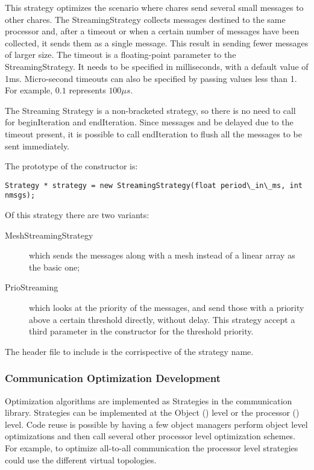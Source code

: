 {This strategy optimizes the scenario where chares send several small messages to
other chares. The StreamingStrategy collects messages destined to the same
processor and, after a timeout or when a certain number of messages have been
collected, it sends them as a single message. This result in sending fewer
messages of larger size. The timeout is a floating-point parameter to the
StreamingStrategy. It needs to be specified in milliseconds, with a default
value of 1ms. Micro-second timeouts can also be specified by passing values less
than 1. For example, $0.1$ represents $100\mu s$.

The Streaming Strategy is a non-bracketed strategy, so there is no need to call
for {\textrm{beginIteration}} and {\textrm{endIteration}}. Since messages and be
delayed due to the timeout present, it is possible to call
{\textrm{endIteration}} to flush all the messages to be sent immediately.

The prototype of the constructor is:

\begin{verbatim}
Strategy * strategy = new StreamingStrategy(float period\_in\_ms, int nmsgs);
\end{verbatim}

Of this strategy there are two variants:

\begin{description}
\item[MeshStreamingStrategy] which sends the messages along with a mesh instead of a linear array as the basic one;
\item[PrioStreaming] which looks at the priority of the messages, and send those with a priority above a certain threshold directly, without delay. This strategy accept a third parameter in the constructor for the threshold priority.
\end{description}

The header file to include is the corrispective of the strategy name.

\subsubsection{Communication Optimization Development}

Optimization algorithms are implemented as Strategies in the communication
library. Strategies can be implemented at the Object (\charmpp) level or the
processor (\converse) level. Code reuse is possible by having a few object
managers perform object level optimizations and then call several other
processor level optimization schemes. For example, to optimize all-to-all
communication the processor level strategies could use the different virtual
topologies.

}
